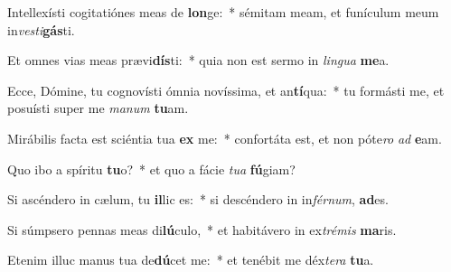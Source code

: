 \item Intellexísti cogitatiónes meas de \textbf{lon}ge:~* sémitam meam, et funículum meum in\textit{ves}\textit{ti}\textbf{gás}ti.
\item Et omnes vias meas prævi\textbf{dís}ti:~* quia non est sermo in \textit{lin}\textit{gua} \textbf{me}a.
\item Ecce, Dómine, tu cognovísti ómnia novíssima, et an\textbf{tí}qua:~* tu formásti me, et posuísti super me \textit{ma}\textit{num} \textbf{tu}am.
\item Mirábilis facta est sciéntia tua \textbf{ex} me:~* confortáta est, et non póte\textit{ro} \textit{ad} \textbf{e}am.
\item Quo ibo a spíritu \textbf{tu}o?~* et quo a fácie \textit{tu}\textit{a} \textbf{fú}giam?
\item Si ascéndero in cælum, tu \textbf{il}lic es:~* si descéndero in in\textit{fér}\textit{num}, \textbf{ad}es.
\item Si súmpsero pennas meas di\textbf{lú}culo,~* et habitávero in ex\textit{tré}\textit{mis} \textbf{ma}ris.
\item Etenim illuc manus tua de\textbf{dú}cet me:~* et tenébit me déx\textit{te}\textit{ra} \textbf{tu}a.
